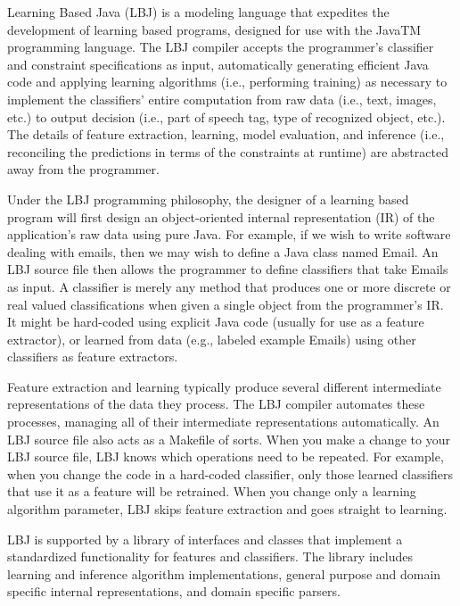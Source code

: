 Learning Based Java (LBJ) is a modeling language that expedites the
development of learning based programs, designed for use with the JavaTM
programming language.  The LBJ compiler accepts the programmer's classifier
and constraint specifications as input, automatically generating efficient
Java code and applying learning algorithms (i.e., performing training) as
necessary to implement the classifiers' entire computation from raw data
(i.e., text, images, etc.) to output decision (i.e., part of speech tag, type
of recognized object, etc.).  The details of feature extraction, learning,
model evaluation, and inference (i.e., reconciling the predictions in terms of
the constraints at runtime) are abstracted away from the programmer.

Under the LBJ programming philosophy, the designer of a learning based program
will first design an object-oriented internal representation (IR) of the
application's raw data using pure Java.  For example, if we wish to write
software dealing with emails, then we may wish to define a Java class named
Email.  An LBJ source file then allows the programmer to define classifiers
that take Emails as input.  A classifier is merely any method that produces
one or more discrete or real valued classifications when given a single object
from the programmer's IR.  It might be hard-coded using explicit Java code
(usually for use as a feature extractor), or learned from data (e.g., labeled
example Emails) using other classifiers as feature extractors.

Feature extraction and learning typically produce several different
intermediate representations of the data they process.  The LBJ compiler
automates these processes, managing all of their intermediate representations
automatically.  An LBJ source file also acts as a Makefile of sorts.  When you
make a change to your LBJ source file, LBJ knows which operations need to be
repeated.  For example, when you change the code in a hard-coded classifier,
only those learned classifiers that use it as a feature will be retrained.
When you change only a learning algorithm parameter, LBJ skips feature
extraction and goes straight to learning.

LBJ is supported by a library of interfaces and classes that implement a
standardized functionality for features and classifiers.  The library includes
learning and inference algorithm implementations, general purpose and domain
specific internal representations, and domain specific parsers.

